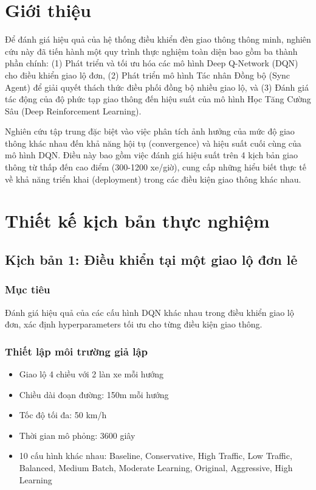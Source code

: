\section{Giới thiệu}

Để đánh giá hiệu quả của hệ thống điều khiển đèn giao thông thông minh, nghiên cứu này đã tiến hành một quy trình thực nghiệm toàn diện bao gồm ba thành phần chính: (1) Phát triển và tối ưu hóa các mô hình Deep Q-Network (DQN) cho điều khiển giao lộ đơn, (2) Phát triển mô hình Tác nhân Đồng bộ (Sync Agent) để giải quyết thách thức điều phối đồng bộ nhiều giao lộ, và (3) Đánh giá tác động của độ phức tạp giao thông đến hiệu suất của mô hình Học Tăng Cường Sâu (Deep Reinforcement Learning).

Nghiên cứu tập trung đặc biệt vào việc phân tích ảnh hưởng của mức độ giao thông khác nhau đến khả năng hội tụ (convergence) và hiệu suất cuối cùng của mô hình DQN. Điều này bao gồm việc đánh giá hiệu suất trên 4 kịch bản giao thông từ thấp đến cao điểm (300-1200 xe/giờ), cung cấp những hiểu biết thực tế về khả năng triển khai (deployment) trong các điều kiện giao thông khác nhau.
\section{Thiết kế kịch bản thực nghiệm}

\subsection{Kịch bản 1: Điều khiển tại một giao lộ đơn lẻ}
\subsubsection{Mục tiêu}
Đánh giá hiệu quả của các cấu hình DQN khác nhau trong điều khiển giao lộ đơn, xác
định hyperparameters tối ưu cho từng điều kiện giao thông.

\subsubsection{Thiết lập môi trường giả lập}
\begin{itemize}
    \item Giao lộ 4 chiều với 2 làn xe mỗi hướng

    \item Chiều dài đoạn đường: 150m mỗi hướng

    \item Tốc độ tối đa: 50 km/h

    \item Thời gian mô phỏng: 3600 giây

    \item 10 cấu hình khác nhau: Baseline, Conservative, High Traffic, Low Traffic, Balanced, Medium Batch, Moderate Learning, Original, Aggressive, High Learning
\end{itemize}

